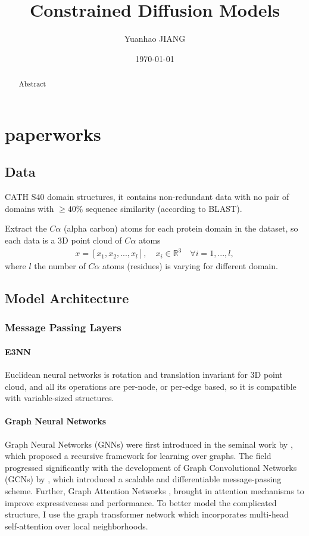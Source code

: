 \documentclass[12pt]{report}
\title{Constrained Diffusion Models}
\date{\today}
\author{Yuanhao JIANG}
\begin{document}
\maketitle

\begin{abstract}
    Abstract
\end{abstract}

\tableofcontents
{}
\newpage
{}

\chapter{paperworks}
\section{Data}
CATH S40 domain structures, it contains non-redundant data with no pair of domains with \(\geq 40\%\) sequence similarity (according to BLAST).

Extract the \(C\alpha\) (alpha carbon) atoms for each protein domain in the dataset, so each data is a 3D point cloud of \(C\alpha\) atoms
\begin{align*}
    x = \left[x_1,x_2,...,x_l\right],\quad x_i\in\mathbb{R}^3\quad\forall i=1,...,l,
\end{align*}
where \(l\) the number of \(C\alpha\) atoms (residues) is varying for different domain.
\section{Model Architecture}
\subsection{Message Passing Layers}
\subsubsection{E3NN}
Euclidean neural networks \cite{thomasTensorFieldNetworks2018,weiler3DSteerableCNNs2018,kondorClebschGordanNetsFully2018} is rotation and translation invariant for 3D point cloud, and all its operations are per-node, or per-edge based, so it is compatible with variable-sized structures.
\subsubsection{Graph Neural Networks}
Graph Neural Networks (GNNs) were first introduced in the seminal work by \cite{scarselliGraphNeuralNetwork2009}, which proposed a recursive framework for learning over graphs. The field progressed significantly with the development of Graph Convolutional Networks (GCNs) by \cite{kipfSemiSupervisedClassificationGraph2017}, which introduced a scalable and differentiable message-passing scheme. Further, Graph Attention Networks \cite{velickovicGraphAttentionNetworks2018}, brought in attention mechanisms to improve expressiveness and performance. To better model the complicated structure, I use the graph transformer network \cite{shiMaskedLabelPrediction2021} which incorporates multi-head self-attention over local neighborhoods.
\end{document}
